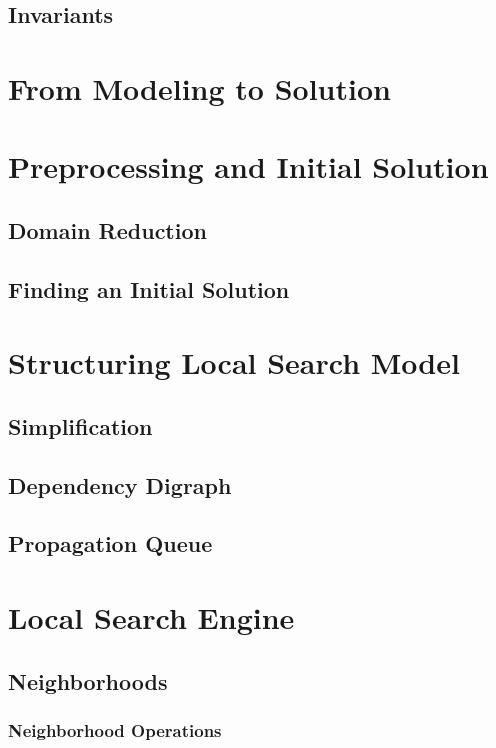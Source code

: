 \documentclass[a4paper,11pt]{article}
\begin{document}
  \subsection{Invariants}
  

\newpage
\section{From Modeling to Solution}
\section{Preprocessing and Initial Solution} \label{sec_gecode}
  
  \subsection{Domain Reduction}
  
  \subsection{Finding an Initial Solution}
  

\newpage
\section{Structuring Local Search Model} \label{sec_ls}

  \subsection{Simplification}
  
  \subsection{Dependency Digraph}
     \label{sec_ddg}
  \subsection{Propagation Queue}  
    \label{sec_propaqueue}
    
  
\newpage  
\section{Local Search Engine} \label{sec_local}
  \subsection{Neighborhoods}
    \subsubsection{Neighborhood Operations}
\end{document}
